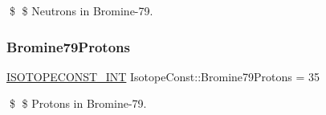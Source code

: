 \$ \$ Neutrons in Bromine-\/79. \mbox{\label{group___isotope_const-_bromine-_br79_ga7ab9a9a2a7f5f46381da4f72f6d94ae3}} 
\subsubsection{\texorpdfstring{Bromine79\+Protons}{Bromine79Protons}}
{\footnotesize\ttfamily \mbox{\hyperlink{group___isotope_const-_macros_ga5f18360b3e99483a35c32d789e62621c}{I\+S\+O\+T\+O\+P\+E\+C\+O\+N\+S\+T\+\_\+\+I\+NT}} Isotope\+Const\+::\+Bromine79\+Protons = 35}

\$ \$ Protons in Bromine-\/79. 